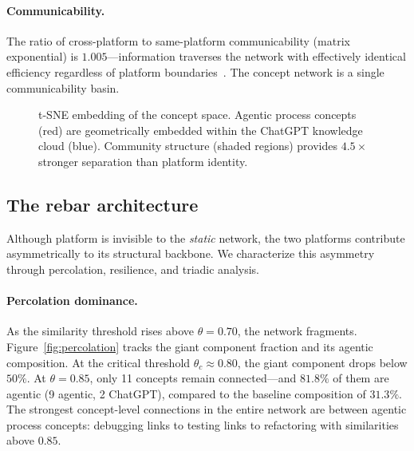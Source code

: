 \documentclass[11pt,twocolumn]{article}
\begin{document}
\paragraph{Communicability.}
The ratio of cross-platform to same-platform communicability (matrix exponential) is $1.005$---information traverses the network with effectively identical efficiency regardless of platform boundaries~\citep{estrada2008communicability}.
The concept network is a single communicability basin.

\begin{figure}[t]
  \centering
  \caption{t-SNE embedding of the concept space.  Agentic process concepts (red) are geometrically embedded within the ChatGPT knowledge cloud (blue).  Community structure (shaded regions) provides $4.5\times$ stronger separation than platform identity.}
  \label{fig:tsne}
\end{figure}


\subsection{The rebar architecture}
\label{sec:results:rebar}

Although platform is invisible to the \emph{static} network, the two platforms contribute asymmetrically to its structural backbone.
We characterize this asymmetry through percolation, resilience, and triadic analysis.

\paragraph{Percolation dominance.}
As the similarity threshold rises above $\theta = 0.70$, the network fragments.
Figure~\ref{fig:percolation} tracks the giant component fraction and its agentic composition.
At the critical threshold $\theta_c \approx 0.80$, the giant component drops below $50\%$.
At $\theta = 0.85$, only 11 concepts remain connected---and $81.8\%$ of them are agentic (9 agentic, 2 ChatGPT), compared to the baseline composition of $31.3\%$.
The strongest concept-level connections in the entire network are between agentic process concepts: debugging links to testing links to refactoring with similarities above $0.85$.
\end{document}
